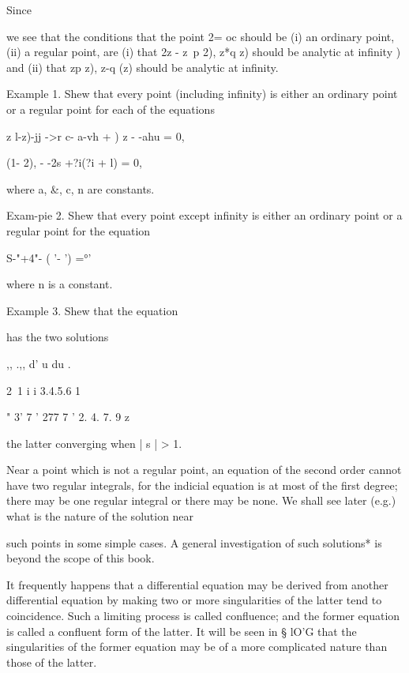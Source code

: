 Since

we see that the conditions that the point 2= oc should be (i) an
ordinary point, (ii) a regular point, are (i) that 2z - z~p 2), z*q z)
should be analytic at infinity ) and (ii) that zp z), z-q (z)
should be analytic at infinity.

Example 1. Shew that every point (including infinity) is either an
ordinary point or a regular point for each of the equations

z l-z)-jj ->r c- a-vh + ) z - -ahu = 0,

(1- 2), - -2s +?i(?i + l) = 0,

where a, \&, c, n are constants.

Exam-pie 2. Shew that every point except infinity is either an
ordinary point or a regular point for the equation

 S-"+4"- ( '- ') =°'

where n is a constant.

Example 3. Shew that the equation

has the two solutions

,, .,, d' u du .

2\ 1 i i 3.4.5.6 1

 " 3' 7 ' 277 7 ' 2. 4. 7. 9 z

the latter converging when | s | > 1.


Near a point which is not a regular point, an equation of the second
order cannot have two regular integrals, for the indicial equation is
at most of the first degree; there may be one regular integral or
there may be none. We shall see later (e.g.) what is the nature
of the solution near

%
%

such points in some simple cases. A general investigation of such
solutions* is beyond the scope of this book.

It frequently happens that a differential equation may be derived from
another differential equation by making two or more singularities of
the latter tend to coincidence. Such a limiting process is called
confluence; and the former equation is called a confluent form of the
latter. It will be seen in § lO'G that the singularities of the former
equation may be of a more complicated nature than those of the latter.


